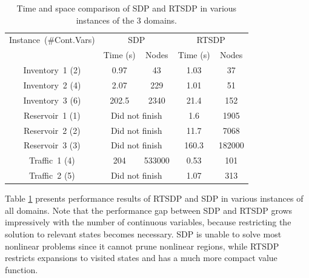 \documentclass[letterpaper]{article}
\begin{document}
\begin{table}[!ht]
\centering
\scriptsize
\begin{tabular}{c|cc|cc}
	\toprule
	Instance~(\#Cont.Vars)	 & \multicolumn{2}{c|}{SDP} & \multicolumn{2}{c}{RTSDP}  \\  \cmidrule{2-5}
	 & Time (s) & Nodes & Time (s) & Nodes \\ \midrule
	Inventory~1 (2)  & 0.97 & 43 & 1.03 & 37\\%
	Inventory~2 (4) & 2.07 & 229 & 1.01 & 51\\
	Inventory~3 (6) & 202.5 & 2340 & 21.4 & 152\\ \bottomrule \toprule
	Reservoir~1 (1) & \multicolumn{2}{c|}{Did not finish} & 1.6 & 1905\\
	Reservoir~2 (2) & \multicolumn{2}{c|}{Did not finish} & 11.7 & 7068\\
	Reservoir~3 (3) & \multicolumn{2}{c|}{Did not finish} & 160.3 & 182000\\ \bottomrule \toprule
	Traffic~1 (4) & 204 & 533000 & 0.53 & 101\\
	Traffic~2 (5) & \multicolumn{2}{c|}{Did not finish} & 1.07 & 313\\ \bottomrule
\end{tabular}
\caption{\small Time and space comparison of SDP and RTSDP in various instances of the 3 domains.}
\label{tab:all}
\end{table}

Table \ref{tab:all} presents performance results of RTSDP and SDP in various instances of all domains. Note that the performance gap between SDP and RTSDP grows impressively with the number of continuous variables, because restricting the solution to relevant states becomes necessary. SDP is unable to solve most nonlinear problems since it cannot prune nonlinear regions, while RTSDP restricts expansions to visited states and has a much more compact value function.
\end{document}
